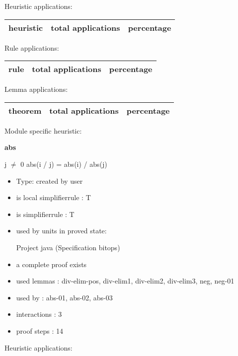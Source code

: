 \documentclass[a4paper]{article}
\begin{document}
\medskip


Heuristic applications:

\begin{supertabular}{l|r|r}
heuristic	& total applications & percentage \\ \hline

\end{supertabular}

Rule applications:

\begin{supertabular}{l|r|r}
rule	        & total applications & percentage \\ \hline

\end{supertabular}

Lemma applications:

\begin{supertabular}{l|r|r}
theorem	        & total applications & percentage \\ \hline

\end{supertabular}

Module specific heuristic:

\pagebreak

{\LARGE\bf abs}\label{lemma-abs}

\medskip

j $\neq$ 0 \Fol abs(i / j) = abs(i) / abs(j)

\begin{itemize}

\item Type: created by user

\item is local simplifierrule : T
\item is simplifierrule : T
\item used by units in proved state:

Project java (Specification bitops)
\item       a complete proof exists
\item       used lemmas  : div-elim-pos, div-elim1, div-elim2, div-elim3, neg, neg-01
\item       used by      : abs-01, abs-02, abs-03
\item       interactions : 3
\item       proof steps  : 14
\end{itemize}

\medskip


Heuristic applications:
\end{document}
